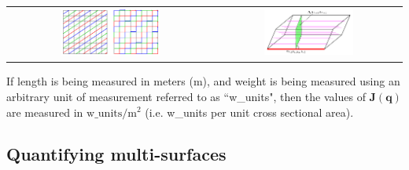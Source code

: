 \documentclass{book}
\begin{document}
\begin{tabular}{cc}
\parbox{0.5\textwidth}{
\includegraphics[width = 0.5\textwidth]{Coordinate_systems/approximating_a_2D_multi-path}
} & \parbox{0.5\textwidth}{
\includegraphics[width = 0.5\textwidth]{Coordinate_systems/edge_weight_diffusion}
}
\end{tabular}

If length is being measured in meters (m), and weight is being measured using an arbitrary unit of measurement referred to as ``w\_units", then the values of \(\mathbf{J}(\mathbf{q})\) are measured in \(\text{w\_units}/\text{m}^2\) (i.e. w\_units per unit cross sectional area).

%
%




\subsection*{Quantifying multi-surfaces}
\end{document}
